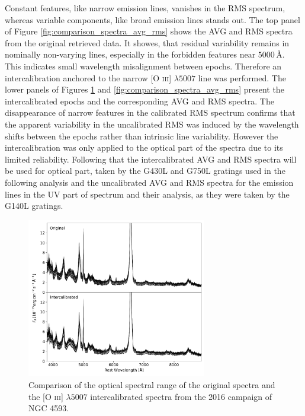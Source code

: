 Constant features, like narrow emission lines, vanishes in the RMS spectrum, whereas variable components, like broad emission lines stands out. The top panel of Figure \ref{fig:comparison_spectra_avg_rms} shows the AVG and RMS spectra from the original retrieved data. It showes, that residual variability remains in nominally non-varying lines, especially in the forbidden features near $5000\,\text{\AA}$. This indicates small wavelength misalignment between epochs. Therefore an intercalibration anchored to the narrow [O \textsc{iii}] $\lambda5007$ line was performed. The lower panels of Figures \ref{fig:comparison_spectra} and \ref{fig:comparison_spectra_avg_rms} present the intercalibrated epochs and the corresponding AVG and RMS spectra. The disappearance of narrow features in the calibrated RMS spectrum confirms that the apparent variability in the uncalibrated RMS was induced by the wavelength shifts between the epochs rather than intrinsic line variability. However the intercalibration was only applied to the optical part of the spectra  due to its limited reliability. Following that the intercalibrated AVG and RMS spectra will be used for optical part, taken by the G430L and G750L gratings used in the following analysis and the uncalibrated AVG and RMS spectra for the emission lines in the UV part of spectrum and their analysis, as they were taken by the G140L gratings. 
\newpage
\begin{figure}[!ht]
	\centering
	\includegraphics[width=0.7\textwidth]{pictures/Chapter3/comparison_spectra}
	\caption{Comparison of the optical spectral range of the original spectra and the [O \textsc{iii}] $\lambda5007$ intercalibrated spectra from the 2016 campaign of NGC 4593.}
	\label{fig:comparison_spectra}
\end{figure}




